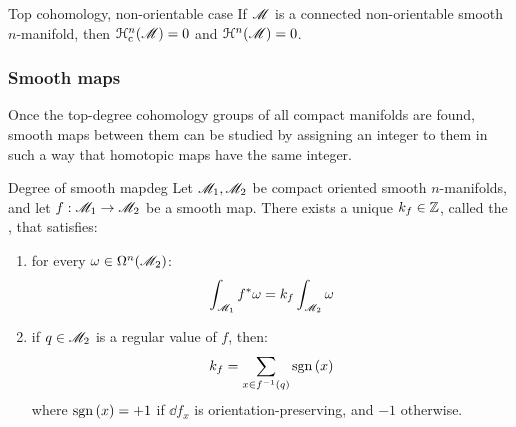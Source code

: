 \begin{proposition}{Top cohomology, non-orientable case}{}
  If $ \mathscr{M} $ is a connected non-orientable smooth $ n $-manifold, then $ \EuScript{H}_\text{c}^{n}(\mathscr{M}) = 0 $ and $ \EuScript{H}^{n}(\mathscr{M}) = 0 $.
\end{proposition}

\subsubsection{Smooth maps}

Once the top-degree cohomology groups of all compact manifolds are found, smooth maps between them can be studied by assigning an integer to them in such a way that homotopic maps have the same integer.

\begin{theorem}{Degree of smooth map}{deg}
  Let $ \mathscr{M}_1 , \mathscr{M}_2 $ be compact oriented smooth $ n $-manifolds, and let $ f : \mathscr{M}_1 \rightarrow \mathscr{M}_2 $ be a smooth map. There exists a unique $ k_f \in \mathbb{Z} $, called the , that satisfies:
  \begin{enumerate}
    \item \label{item:deg-1} for every $ \omega \in \Omega^{n}(\mathscr{M}_2) $:
      \begin{equation*}
        \int_{\mathscr{M}_1} f^* \omega = k_f \int_{\mathscr{M}_2} \omega
      \end{equation*}
    \item \label{item:deg-2} if $ q \in \mathscr{M}_2 $ is a regular value of $ f $, then:
      \begin{equation*}
        k_f = \sum_{x \in f^{-1}(q)} \mathrm{sgn}\,(x)
      \end{equation*}
      where $ \mathrm{sgn}\,(x) = +1 $ if $ \dd f_x $ is orientation-preserving, and $ -1 $ otherwise.
  \end{enumerate}
\end{theorem}

